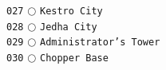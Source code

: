\documentclass[a4paper,landscape]{article}
\begin{document}
\begin{multicols*}{5}
\texttt{027} \(\bigcirc\)  \texttt{Kestro City} \vspace{-0.3mm}\\ 
\texttt{028} \(\bigcirc\)  \texttt{Jedha City} \vspace{-0.3mm}\\ 
\texttt{029} \(\bigcirc\)  \texttt{Administrator's Tower} \vspace{-0.3mm}\\ 
\texttt{030} \(\bigcirc\)  \texttt{Chopper Base} \vspace{-0.3mm}\\ 

\end{multicols*}
\end{document}
